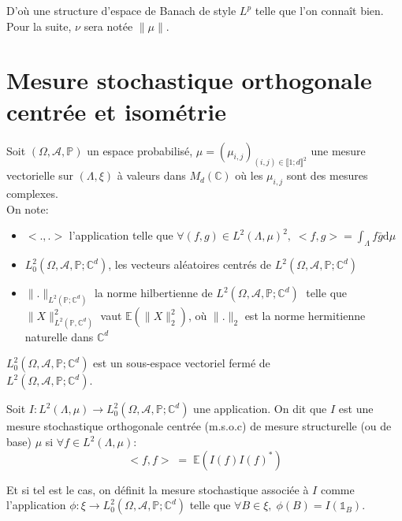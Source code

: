 \noindent D'où une structure d'espace de Banach de style $L^p$ telle que l'on connaît bien. Pour la suite, $\nu$ sera notée $\|\mu\|$. 

\section{Mesure stochastique orthogonale centrée et isométrie}

Soit $(\Omega, \mathcal{A}, \mathbb{P})$ un espace probabilisé, $\mu = (\mu_{i,j})_{(i,j) \in \llbracket 1;d \rrbracket^2}$ une mesure vectorielle sur $(\Lambda, \xi)$ à valeurs dans $M_d(\mathbb{C})$ où les $\mu_{i,j}$ sont des mesures complexes.\\

\noindent On note:
\begin{itemize}
\item $<.,.>$ l'application telle que $\forall (f,g) \in L^{2}(\Lambda, \mu)^2, \; <f,g> = \displaystyle\int_{\Lambda} f\bar{g} \mathrm{d}\mu$ \\

\item $L^{2}_{0}(\Omega, \mathcal{A}, \mathbb{P}; \mathbb{C}^{d})$, les vecteurs aléatoires centrés de $L^{2}(\Omega, \mathcal{A}, \mathbb{P}; \mathbb{C}^{d})$\\

\item $\|.\|_{L^{2}(\mathbb{P}; \mathbb{C}^d)}$ la norme hilbertienne de $L^{2}(\Omega, \mathcal{A}, \mathbb{P}; \mathbb{C}^{d}) \;$ telle que $\|X\|_{L^{2}(\mathbb{P}, \mathbb{C}^d)}^2$ vaut $ \mathbb{E}(\|X\|^{2}_{2})$, où $\|.\|_{2}$ est la norme hermitienne naturelle dans $\mathbb{C}^{d}$\\
\end{itemize}

\begin{remark}$L^{2}_{0}(\Omega, \mathcal{A}, \mathbb{P};\mathbb{C}^{d})$ est un sous-espace vectoriel fermé de \\$L^{2}(\Omega, \mathcal{A}, \mathbb{P}; \mathbb{C}^{d})$.\end{remark}

\begin{definition}
Soit $I: L^{2}(\Lambda, \mu)  \rightarrow L^{2}_{0}(\Omega, \mathcal{A}, \mathbb{P}; \mathbb{C}^{d})$ une application. On dit que $I$ est une mesure stochastique orthogonale centrée (m.s.o.c) de mesure structurelle (ou de base) $\mu$ si $\forall f \in L^{2}(\Lambda, \mu)$:
\begin{equation}
<f,f>\;=\;\mathbb{E}(I(f)I(f)^{*})
\end{equation}

\noindent Et si tel est le cas, on définit la mesure stochastique associée à $I$ comme l'application $\phi: \xi \rightarrow L^{2}_{0}(\Omega, \mathcal{A}, \mathbb{P}; \mathbb{C}^{d})$ telle que $\forall B \in \xi, \; \phi(B)= I(\mathds{1}_{B})$.
\end{definition}

